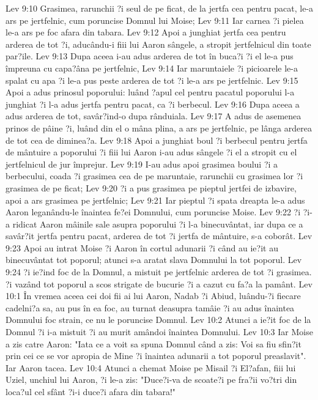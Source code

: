 Lev 9:10  Grasimea, rarunchii ?i seul de pe ficat, de la jertfa cea pentru pacat, le-a ars pe jertfelnic, cum poruncise Domnul lui Moise;
Lev 9:11  Iar carnea ?i pielea le-a ars pe foc afara din tabara.
Lev 9:12  Apoi a junghiat jertfa cea pentru arderea de tot ?i, aducându-i fiii lui Aaron sângele, a stropit jertfelnicul din toate par?ile.
Lev 9:13  Dupa aceea i-au adus arderea de tot în buca?i ?i el le-a pus împreuna cu capa?âna pe jertfelnic,
Lev 9:14  Iar maruntaiele ?i picioarele le-a spalat cu apa ?i le-a pus peste arderea de tot ?i le-a ars pe jertfelnic.
Lev 9:15  Apoi a adus prinosul poporului: luând ?apul cel pentru pacatul poporului l-a junghiat ?i l-a adus jertfa pentru pacat, ca ?i berbecul.
Lev 9:16  Dupa aceea a adus arderea de tot, savâr?ind-o dupa rânduiala.
Lev 9:17  A adus de asemenea prinos de pâine ?i, luând din el o mâna plina, a ars pe jertfelnic, pe lânga arderea de tot cea de diminea?a.
Lev 9:18  Apoi a junghiat boul ?i berbecul pentru jertfa de mântuire a poporului ?i fiii lui Aaron i-au adus sângele ?i el a stropit cu el jertfelnicul de jur împrejur.
Lev 9:19  I-au adus apoi grasimea boului ?i a berbecului, coada ?i grasimea cea de pe maruntaie, rarunchii cu grasimea lor ?i grasimea de pe ficat;
Lev 9:20  ?i a pus grasimea pe pieptul jertfei de izbavire, apoi a ars grasimea pe jertfelnic;
Lev 9:21  Iar pieptul ?i spata dreapta le-a adus Aaron leganându-le înaintea fe?ei Domnului, cum poruncise Moise.
Lev 9:22  ?i ?i-a ridicat Aaron mâinile sale asupra poporului ?i l-a binecuvântat, iar dupa ce a savâr?it jertfa pentru pacat, arderea de tot ?i jertfa de mântuire, s-a coborât.
Lev 9:23  Apoi au intrat Moise ?i Aaron în cortul adunarii ?i când au ie?it au binecuvântat tot poporul; atunci s-a aratat slava Domnului la tot poporul.
Lev 9:24  ?i ie?ind foc de la Domnul, a mistuit pe jertfelnic arderea de tot ?i grasimea. ?i vazând tot poporul a scos strigate de bucurie ?i a cazut cu fa?a la pamânt.
Lev 10:1  În vremea aceea cei doi fii ai lui Aaron, Nadab ?i Abiud, luându-?i fiecare cadelni?a sa, au pus în ea foc, au turnat deasupra tamâie ?i au adus înaintea Domnului foc strain, ce nu le poruncise Domnul.
Lev 10:2  Atunci a ie?it foc de la Domnul ?i i-a mistuit ?i au murit amândoi înaintea Domnului.
Lev 10:3  Iar Moise a zis catre Aaron: "Iata ce a voit sa spuna Domnul când a zis: Voi sa fiu sfin?it prin cei ce se vor apropia de Mine ?i înaintea adunarii a tot poporul preaslavit". Iar Aaron tacea.
Lev 10:4  Atunci a chemat Moise pe Misail ?i El?afan, fiii lui Uziel, unchiul lui Aaron, ?i le-a zis: "Duce?i-va de scoate?i pe fra?ii vo?tri din loca?ul cel sfânt ?i-i duce?i afara din tabara!"
